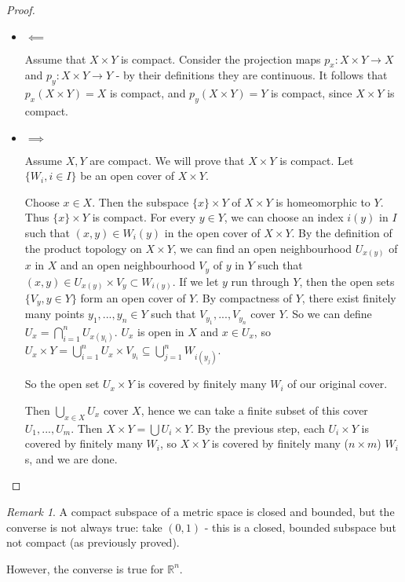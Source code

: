 \documentclass{article}
\theoremstyle{definition}
\theoremstyle{plain}%
\theoremstyle{remark}
\newtheorem*{rem}{Remark}
\newcommand{\Union}{\bigcup}
\newcommand{\Intersection}{\bigcap}
\newcommand{\R}{\mathbb{R}}
\begin{document}
\begin{proof}
    \begin{itemize}
        \item $\impliedby$
        
        Assume that $X \times Y$ is compact. Consider the projection maps $p_x : X\times Y \to X$ and $p_y : X \times Y \to Y$ - by their definitions they are continuous. It follows that $p_x(X \times Y) = X$ is compact, and $p_y(X \times Y) = Y$ is compact, since $X \times Y$ is compact.
        \item $\implies$
        
        Assume $X, Y$ are compact. We will prove that $X \times Y$ is compact. Let $\{W_i, i \in I\}$ be an open cover of $X \times Y$.
        
        Choose $x \in X$. Then the subspace $\{x\} \times Y$ of $X \times Y$ is homeomorphic to $Y$. Thus $\{x\}\times Y$ is compact. For every $y \in Y$, we can choose an index $i(y)$ in $I$ such that $(x,y) \in W_i(y)$ in the open cover of $X \times Y$. By the definition of the product topology on $X \times Y$, we can find an open neighbourhood $U_{x(y)}$ of $x$ in $X$ and an open neighbourhood $V_y$ of $y$ in $Y$ such that $(x,y) \in U_{x(y)} \times V_y \subset W_{i(y)}$. If we let $y$ run through $Y$, then the open sets $\{V_y, y \in Y\}$ form an open cover of $Y$. By compactness of $Y$, there exist finitely many points $y_1, ..., y_n \in Y$ such that $V_{y_1}, ..., V_{y_n}$ cover $Y$. So we can define $U_{x} = \Intersection_{i=1}^n U_{x(y_i)}$. $U_x$ is open in $X$ and $x \in U_x$, so $U_x \times Y = \Union_{i=1}^n U_x \times V_{y_i} \subseteq \Union_{j = 1}^n W_{i(y_j)}$.
        
        So the open set $U_x \times Y$ is covered by finitely many $W_i$ of our original cover.
        
        Then $\Union_{x \in X} U_x$ cover $X$, hence we can take a finite subset of this cover $U_1, ..., U_m$. Then $X \times Y = \Union U_{i} \times Y$. By the previous step, each $U_i \times Y$ is covered by finitely many $W_i$, so $X \times Y$ is covered by finitely many ($n \times m$) $W_i$s, and we are done.
    \end{itemize}
\end{proof}

\begin{rem}
    A compact subspace of a metric space is closed and bounded, but the converse is not always true: take $(0,1)$ - this is a closed, bounded subspace but not compact (as previously proved).
    
    However, the converse is true for $\R^n$.
\end{rem}
\end{document}
